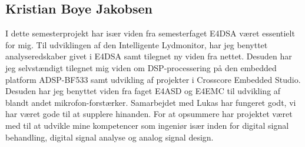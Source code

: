\subsection*{Kristian Boye Jakobsen}
I dette semesterprojekt har især viden fra semesterfaget E4DSA været essentielt for mig. Til udviklingen af den Intelligente Lydmonitor, har jeg benyttet analyseredskaber givet i E4DSA samt tilegnet ny viden fra nettet. 
Desuden har jeg selvstændigt tilegnet mig viden om DSP-processering på den embedded platform ADSP-BF533 samt udvikling af projekter i Crosscore Embedded Studio. Desuden har jeg benyttet viden fra faget E4ASD og E4EMC til udvikling af blandt andet mikrofon-forstærker.
Samarbejdet med Lukas har fungeret godt, vi har været gode til at supplere hinanden.
For at opsummere har projektet været med til at udvikle mine kompetencer som ingeniør især inden for digital signal behandling, digital signal analyse og analog signal design. 
